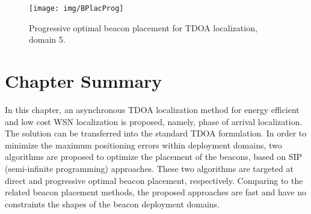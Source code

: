 \begin{figure}
  \centering
  \texttt{[image: img/BPlacProg]}\\
  \caption{Progressive optimal beacon placement for TDOA localization, domain 5.}\label{f:BPlacProg}
\end{figure}


\section{Chapter Summary}
In this chapter, an asynchronous TDOA localization method for energy efficient and low cost WSN localization is proposed, namely, phase of arrival localization. The solution can be transferred into the standard TDOA formulation.
    In order to minimize the maximum positioning errors within deployment domains, two algorithms are proposed to optimize the placement of the beacons, based on SIP (semi-infinite programming) approaches.
These two algorithms are targeted at direct and progressive optimal beacon placement, respectively. Comparing to the related beacon placement methods, the proposed approaches are fast and have no constraints the shapes of the beacon deployment domains.
